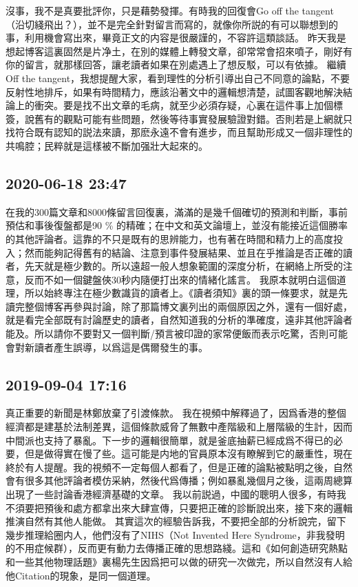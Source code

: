 \documentclass[twocolumn]{ctexart}
\begin{document}
沒事，我不是真要批評你，只是藉勢發揮。有時我的回復會Go off the tangent（沿切綫飛出？），並不是完全針對留言而寫的，就像你所説的有可以聯想到的事，利用機會寫出來，畢竟正文的内容是很嚴謹的，不容許這類談話。
昨天我是想起博客這裏固然是片净土，在別的媒體上轉發文章，卻常常會招來噴子，剛好有你的留言，就那樣回答，讓老讀者如果在別處遇上了想反駁，可以有依據。
繼續Off the tangent，我想提醒大家，看到理性的分析引導出自己不同意的論點，不要反射性地排斥，如果有時間精力，應該沿著文中的邏輯想清楚，試圖客觀地解決結論上的衝突。要是找不出文章的毛病，就至少必須存疑，心裏在這件事上加個標簽，說舊有的觀點可能有些問題，然後等待事實發展驗證對錯。否則若是上網就只找符合既有認知的説法來讀，那麽永遠不會有進步，而且幫助形成又一個非理性的共鳴腔；民粹就是這樣被不斷加强壯大起來的。
\subsection*{2020-06-18 23:47}

在我的300篇文章和8000條留言回復裏，滿滿的是幾千個確切的預測和判斷，事前預估和事後復盤都是90 \% 的精確；在中文和英文論壇上，並沒有能接近這個勝率的其他評論者。這靠的不只是既有的思辨能力，也有著在時間和精力上的高度投入；然而能夠記得舊有的結論、注意到事件發展結果、並且在乎推論是否正確的讀者，先天就是極少數的。所以遠超一般人想象範圍的深度分析，在網絡上所受的注意，反而不如一個鍵盤俠30秒内隨便打出來的情緒化謠言。
我原本就明白這個道理，所以始終專注在極少數識貨的讀者上。《讀者須知》裏的頭一條要求，就是先讀完整個博客再參與討論，除了那篇博文裏列出的兩個原因之外，還有一個好處，就是看完全部既有討論歷史的讀者，自然知道我的分析的準確度，遠非其他評論者能及。所以請你不要對又一個判斷/預言被印證的家常便飯而表示吃驚，否則可能會對新讀者產生誤導，以爲這是偶爾發生的事。
\subsection*{2019-09-04 17:16}

真正重要的新聞是林鄭放棄了引渡條款。 
我在視頻中解釋過了，因爲香港的整個經濟都是建基於法制差異，這個條款威脅了無數中產階級和上層階級的生計，因而中間派也支持了暴亂。下一步的邏輯很簡單，就是釜底抽薪已經成爲不得已的必要，但是做得實在慢了些。這可能是内地的官員原本沒有瞭解到它的嚴重性，現在終於有人提醒。我的視頻不一定每個人都看了，但是正確的論點被點明之後，自然會有很多其他評論者模仿采納，然後代爲傳播；例如暴亂幾個月之後，這兩周總算出現了一些討論香港經濟基礎的文章。 
我以前説過，中國的聰明人很多，有時我不須要把預後和處方都拿出來大肆宣傳，只要把正確的診斷說出來，接下來的邏輯推演自然有其他人能做。 
其實這次的經驗告訴我，不要把全部的分析說完，留下幾步推理給圈内人，他們沒有了NIHS（Not Invented Here Syndrome，非我發明的不用症候群），反而更有動力去傳播正確的思想路綫。這和《如何創造研究熱點和一些其他物理話題》裏楊先生因爲把可以做的研究一次做完，所以自然沒有人給他Citation的現象，是同一個道理。
\end{document}
